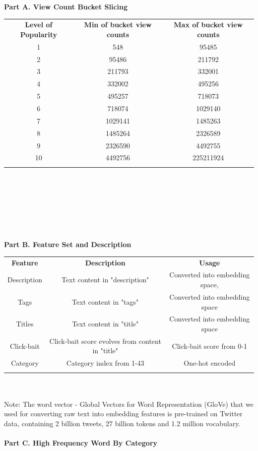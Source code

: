 \documentclass[english]{article}
\begin{document}
\bf{ Part A. View Count Bucket Slicing}\\
\begin{enumerate}
    \begin{tabular}{||c||c||c||}
        \hhline{|=|=|=|}
        \textbf{Level of Popularity}&\textbf{Min of bucket view counts}&\textbf{Max of bucket view counts}\\
        \hhline{|=|=|=|}
            1 &548  &95485\\
            2 &95486  &211792\\
            3 &211793  &332001\\
            4 &332002  &495256\\
            5 &495257  &718073\\
            6 &718074  &1029140\\
            7 &1029141  &1485263\\
            8 &1485264  &2326589\\
            9 &2326590  &4492755\\
            10 &4492756  &225211924\\
        \hhline{|=|=|=|}
    \end{tabular}\\
\end{enumerate}
\\
        \\
        \\
        \\
        \\
\bf{ Part B. Feature Set and Description}\\
        
    \begin{tabular}{||c||c||c||}
        \hhline{|=|=|=|}
        \textbf{Feature}&\textbf{Description}&\textbf{Usage}\\
        \hhline{|=|=|=|}
         Description & Text content in "description" & Converted into embedding space, \\
         Tags & Text content in "tags" & Converted into embedding space\\
         Titles & Text content in "title" & Converted into embedding space\\
         Click-bait &  Click-bait score evolves from content in "title" & Click-bait score from 0-1\\
         Category & Category index from 1-43 & One-hot encoded\\
        \hhline{|=|=|=|}
    \end{tabular}\\ \\
         Note: The word vector - Global Vectors for Word Representation (GloVe) \cite{pennington2014glove} that we used for converting raw text into embedding features is pre-trained on Twitter data, containing 2 billion tweets, 27 billion tokens and 1.2 million vocabulary.
         \\
         \\
\bf{ Part C. High Frequency Word By Category}
\end{document}
